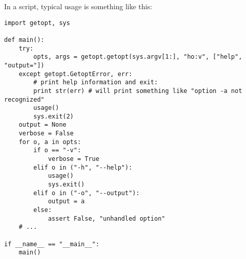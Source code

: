 In a script, typical usage is something like this:

\begin{verbatim}
import getopt, sys

def main():
    try:
        opts, args = getopt.getopt(sys.argv[1:], "ho:v", ["help", "output="])
    except getopt.GetoptError, err:
        # print help information and exit:
        print str(err) # will print something like "option -a not recognized"
        usage()
        sys.exit(2)
    output = None
    verbose = False
    for o, a in opts:
        if o == "-v":
            verbose = True
        elif o in ("-h", "--help"):
            usage()
            sys.exit()
        elif o in ("-o", "--output"):
            output = a
        else:
            assert False, "unhandled option"
    # ...

if __name__ == "__main__":
    main()
\end{verbatim}

\begin{seealso}
\end{seealso}
